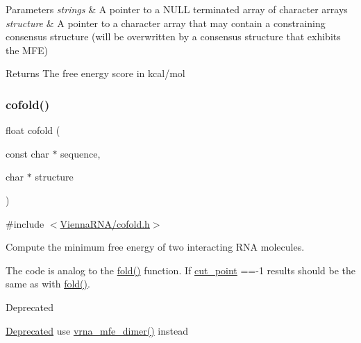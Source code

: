 \begin{DoxyParams}{Parameters}
{\em strings} & A pointer to a N\+U\+LL terminated array of character arrays \\
\hline
{\em structure} & A pointer to a character array that may contain a constraining consensus structure (will be overwritten by a consensus structure that exhibits the M\+FE) \\
\hline
\end{DoxyParams}
\begin{DoxyReturn}{Returns}
The free energy score in kcal/mol 
\end{DoxyReturn}
\mbox{\label{group__mfe__global__deprecated_gabc8517f22cfe70595ee81fc837910d52}} 
\subsubsection{\texorpdfstring{cofold()}{cofold()}}
{\footnotesize\ttfamily float cofold (\begin{DoxyParamCaption}\item[{const char $\ast$}]{sequence,  }\item[{char $\ast$}]{structure }\end{DoxyParamCaption})}



{\ttfamily \#include $<$\hyperlink{cofold_8h}{Vienna\+R\+N\+A/cofold.\+h}$>$}



Compute the minimum free energy of two interacting R\+NA molecules. 

The code is analog to the \hyperlink{group__mfe__global__deprecated_gaadafcb0f140795ae62e5ca027e335a9b}{fold()} function. If \hyperlink{fold__vars_8h_ab9b2c3a37a5516614c06d0ab54b97cda}{cut\+\_\+point} ==-\/1 results should be the same as with \hyperlink{group__mfe__global__deprecated_gaadafcb0f140795ae62e5ca027e335a9b}{fold()}.

\begin{DoxyRefDesc}{Deprecated}
\item[\hyperlink{deprecated__deprecated000030}{Deprecated}]use \hyperlink{group__mfe__global_gaab22d10c1190f205f16a77cab9d5d3ee}{vrna\+\_\+mfe\+\_\+dimer()} instead\end{DoxyRefDesc}



